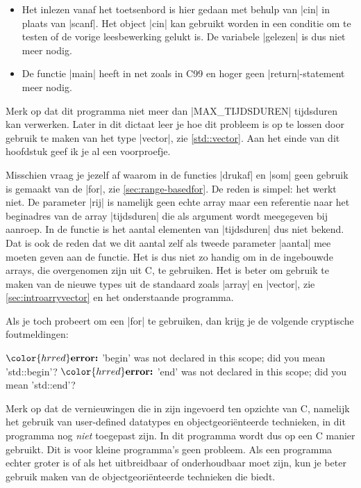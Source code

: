 \begin{cpplstShortInline}
\begin{itemize}
    \item 
    Het inlezen vanaf het toetsenbord is hier gedaan met behulp van |cin| in plaats van |scanf|.
	Het object |cin| kan gebruikt worden in een conditie om te testen of de vorige leesbewerking gelukt is.
	De variabele |gelezen| is dus niet meer nodig.
	\item 
	De functie |main| heeft in \Cpp{} net zoals in C99 en hoger geen |return|\hyp{}statement meer nodig.
\end{itemize}

Merk op dat dit programma niet meer dan |MAX_TIJDSDUREN| tijdsduren kan verwerken.
Later in dit dictaat leer je hoe dit probleem is op te lossen door gebruik te maken van het type |vector|, zie \cref{std::vector}.
Aan het einde van dit hoofdstuk geef ik je al een voorproefje. 

Misschien vraag je jezelf af waarom in de functies |drukaf| en |som| geen gebruik is gemaakt van de  |for|, zie \cref{sec:range-basedfor}.
De reden is simpel: het werkt niet.
De parameter |rij| is namelijk geen echte array maar een referentie naar het beginadres van de array |tijdsduren| die als argument wordt meegegeven bij aanroep.
In de functie is het aantal elementen van |tijdsduren| dus niet bekend.
Dat is ook de reden dat we dit aantal zelf als tweede parameter |aantal| mee moeten geven aan de functie.
Het is dus niet zo handig om in \Cpp{} de ingebouwde arrays, die overgenomen zijn uit C, te gebruiken.
Het is beter om gebruik te maken van de nieuwe types uit de standaard \Cpp{}  zoals |array| en |vector|, zie \cref{sec:introarryvector} en het onderstaande programma.

Als je toch probeert om een  |for| te gebruiken, dan krijg je de volgende cryptische foutmeldingen:
\begin{cpplstfragment}[mathescape=true]
$\color{hrred}\textbf{error:}$ 'begin' was not declared in this scope; did you mean 'std::begin'?
$\color{hrred}\textbf{error:}$ 'end' was not declared in this scope; did you mean 'std::end'?
\end{cpplstfragment}

Merk op dat de vernieuwingen die in \Cpp{} zijn ingevoerd ten opzichte van C, namelijk het gebruik van user-defined datatypes en objectgeoriënteerde technieken, in dit programma nog \emph{niet} toegepast zijn.
In dit programma wordt \Cpp{} dus op een C manier gebruikt.
Dit is voor kleine programma's geen probleem.
Als een programma echter groter is of als het uitbreidbaar of onderhoudbaar moet zijn, kun je beter gebruik maken van de objectgeoriënteerde technieken die \Cpp{} biedt.


\end{cpplstShortInline}
